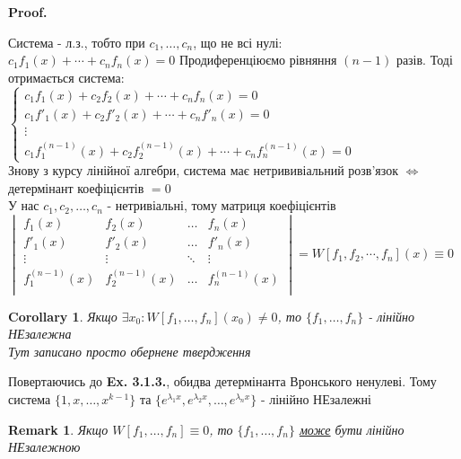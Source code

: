\documentclass[a4paper, 10pt]{article}
\makeatletter
\def\qed{$\blacksquare$}
\theoremstyle{theoremdd}
\theoremstyle{theoremdd}
\theoremstyle{theoremdd}
\theoremstyle{theoremdd}
\theoremstyle{theoremdd}
\theoremstyle{theoremdd}
\newtheorem{remark}[theorem]{Remark}
\theoremstyle{theoremdd}
\theoremstyle{theoremdd}
\newtheorem{corollary}[theorem]{Corollary}
\renewenvironment{proof}[1][Proof.\\]{\par
\pushQED{\hfill \qed}%
\normalfont \topsep6\p@\@plus6\p@\relax
\trivlist
\item\relax
{\bfseries
#1\@addpunct{.}}\hspace\labelsep\ignorespaces
}{%
\popQED\endtrivlist\@endpefalse
}
\makeatother
\begin{document}
	\begin{proof}
Система - л.з., тобто при $c_1, \dots, c_n$, що не всі нулі: \\$c_1f_1(x) + \cdots + c_n f_n(x) = 0$
Продиференціюємо рівняння $(n-1)$ разів. Тоді отримається система:\\
$\begin{cases}
c_1f_1(x) + c_2f_2(x) + \cdots + c_n f_n(x) = 0 \\
c_1f'_1(x) + c_2f'_2(x) + \cdots + c_n f'_n(x) = 0 \\
\vdots \\
c_1f^{(n-1)}_1(x) + c_2f^{(n-1)}_2(x) + \cdots + c_n f^{(n-1)}_n(x) = 0
\end{cases}
$\\
Знову з курсу лінійної алгебри, система має нетрививіальний розв'язок $\iff$ детермінант коефіцієнтів $= 0$\\
У нас $c_1, c_2 ,\dots, c_n$ - нетривіальні, тому матриця коефіцієнтів\\
$ \displaystyle 
\begin{vmatrix} 
	f_1(x) &  f_2(x) & \dots & f_n(x) \\ 
	f'_1(x) &  f'_2(x) & \dots & f'_n(x) \\
	\vdots &  \vdots & \ddots & \vdots \\
	f^{(n-1)}_1(x) &  f^{(n-1)}_2(x) & \dots & f^{(n-1)}_n(x) \\ 
\end{vmatrix} = W[f_1,f_2,\cdots,f_n](x) \equiv 0
$ 
	\end{proof}

\begin{corollary}
 Якщо $\exists x_0: W[f_1,\dots,f_n](x_0) \neq 0$, то $\{f_1, \dots, f_n\}$ - лінійно НЕзалежна\\
\textit{Тут записано просто обернене твердження}\\
\end{corollary}

Повертаючись до \textbf{Ex. 3.1.3.}, обидва детермінанта Вронського ненулеві. Тому система $\{1,x,\dots,x^{k-1}\}$ та $\displaystyle \{e^{\lambda_1 x}, e^{\lambda_2 x}, \dots, e^{\lambda_n x}\}$ - лінійно НЕзалежні
\begin{remark}
 Якщо $W[f_1,\dots, f_n] \equiv 0$, то $\{f_1, \dots, f_n\}$ \underline{може} бути лінійно НЕзалежною
 \end{remark}
\end{document}

